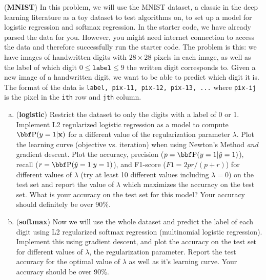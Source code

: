 \documentclass[12pt,letterpaper,fleqn]{hmcpset}
\begin{document}
\begin{problem}[2]
(\textbf{MNIST}) 
In this problem, we will use the MNIST dataset, a classic in the deep learning literature as a toy dataset to test
algorithms on, to set up a model for logistic regression and softmax regression. In the starter code, we have already parsed the data for you. However, you might need internet connection to access the data and therefore successfully run the starter code.
\newline
\newline
The problem is this: we have images of handwritten
digits with $28\times 28$ pixels in each image, as well as the label of which digit $0 \leq \texttt{label} \leq 9$ the written
digit corresponds to. Given a new image of a handwritten digit, we want to be
able to predict which digit it is.
The format of the data is \texttt{label, pix-11, pix-12, pix-13, ...}
where \texttt{pix-ij} is the pixel in the \texttt{ith} row and \texttt{jth} column.
\newline
\begin{enumerate}[(a)]
    \item (\textbf{logistic}) Restrict the dataset to only the digits with a label
        of 0 or 1. Implement L2 regularized logistic regression as a model to compute
        $\PP(y=1|\xx)$ for a different value of the regularization parameter $\lambda$.
        Plot the learning curve (objective vs. iteration) when using Newton's Method
        \textit{and} gradient descent.
        Plot the accuracy, precision ($p = \PP(y=1 | \hat y=1)$), recall ($r = \PP(\hat y=1 | y=1)$),
        and F1-score ($F1 = 2pr / (p+r)$) for different values of $\lambda$ (try at least
        10 different values including $\lambda = 0$) on the test set and report the
        value of $\lambda$ which maximizes the accuracy on the test set. What is your
        accuracy on the test set for this model? Your accuracy should definitely be
        over 90\%.

    \item (\textbf{softmax}) Now we will use the whole dataset and predict the label
        of each digit using L2 regularized softmax regression (multinomial logistic
        regression). Implement this using gradient descent, and plot the accuracy
        on the test set for different values of $\lambda$, the regularization parameter.
        Report the test accuracy for the optimal value of $\lambda$ as well as it's
        learning curve. Your accuracy should be over 90\%.

\end{enumerate}
\end{problem}
\begin{solution}
\vfill
\end{solution}
\newpage
\end{document}
